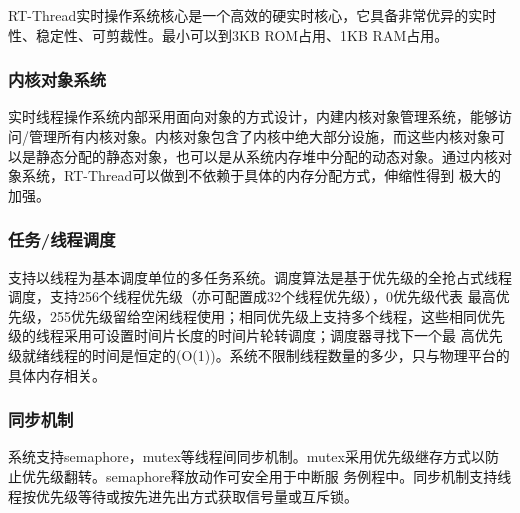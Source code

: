 RT-Thread实{\cf}时操{\cf}作系{\cf}统核{\cf}心是{\cf}一个{\cf}高效{\cf}的硬{\cf}实时{\cf}核心{\cf}，它{\cf}具备{\cf}非常{\cf}优异{\cf}的实{\cf}时性{\cf}、稳{\cf}定性{\cf}、可{\cf}剪裁{\cf}性。{\cf}最小{\cf}可以{\cf}到3{\cf}KB{\cf} R{\cf}OM{\cf}占用{\cf}、1{\cf}KB{\cf} R{\cf}AM{\cf}占用。

\subsubsection{内核对象系统}
实{\cf}时线{\cf}程操{\cf}作系{\cf}统内{\cf}部采{\cf}用面{\cf}向对{\cf}象的{\cf}方式{\cf}设计{\cf}，内{\cf}建内{\cf}核对{\cf}象管{\cf}理系{\cf}统，{\cf}能够{\cf}访问{\cf}/管{\cf}理所{\cf}有内{\cf}核对{\cf}象。{\cf}内核{\cf}对象{\cf}包含{\cf}了内{\cf}核中{\cf}绝大{\cf}部分{\cf}设施{\cf}，而{\cf}这些{\cf}内核{\cf}对象{\cf}可 {\cf}以是{\cf}静态{\cf}分配{\cf}的静{\cf}态对{\cf}象，{\cf}也可{\cf}以是{\cf}从系{\cf}统内{\cf}存堆{\cf}中分{\cf}配的{\cf}动态{\cf}对象{\cf}。通{\cf}过内{\cf}核对{\cf}象系{\cf}统，{\cf}RT{\cf}-T{\cf}hr{\cf}ea{\cf}d可{\cf}以做{\cf}到不{\cf}依赖{\cf}于具{\cf}体的{\cf}内存{\cf}分配{\cf}方式{\cf}，伸{\cf}缩性{\cf}得到{\cf} 极{\cf}大的{\cf}加强。


\subsubsection{任务/线程调度}
支{\cf}持以{\cf}线程{\cf}为基{\cf}本调{\cf}度单{\cf}位的{\cf}多任{\cf}务系{\cf}统。{\cf}调度{\cf}算法{\cf}是基{\cf}于优{\cf}先级{\cf}的全{\cf}抢占{\cf}式线{\cf}程调{\cf}度，{\cf}支持{\cf}25{\cf}6个{\cf}线程{\cf}优先{\cf}级（{\cf}亦可{\cf}配置{\cf}成3{\cf}2个{\cf}线程{\cf}优先{\cf}级）{\cf}，0{\cf}优先{\cf}级代{\cf}表 {\cf}最高{\cf}优先{\cf}级，{\cf}25{\cf}5优{\cf}先级{\cf}留给{\cf}空闲{\cf}线程{\cf}使用{\cf}；相{\cf}同优{\cf}先级{\cf}上支{\cf}持多{\cf}个线{\cf}程，{\cf}这些{\cf}相同{\cf}优先{\cf}级的{\cf}线程{\cf}采用{\cf}可设{\cf}置时{\cf}间片{\cf}长度{\cf}的时{\cf}间片{\cf}轮转{\cf}调度{\cf}；调{\cf}度器{\cf}寻找{\cf}下一{\cf}个最{\cf} 高{\cf}优先{\cf}级就{\cf}绪线{\cf}程的{\cf}时间{\cf}是恒{\cf}定的{\cf}(O{\cf}(1{\cf})){\cf}。系{\cf}统不{\cf}限制{\cf}线程{\cf}数量{\cf}的多{\cf}少，{\cf}只与{\cf}物理{\cf}平台{\cf}的具{\cf}体内{\cf}存相关。

\subsubsection{同步机制}
系{\cf}统支{\cf}持s{\cf}em{\cf}ap{\cf}ho{\cf}re{\cf}，m{\cf}ut{\cf}ex{\cf}等线{\cf}程间{\cf}同步{\cf}机制{\cf}。m{\cf}ut{\cf}ex{\cf}采用{\cf}优先{\cf}级继{\cf}存方{\cf}式以{\cf}防止{\cf}优先{\cf}级翻{\cf}转。{\cf}se{\cf}ma{\cf}ph{\cf}or{\cf}e释{\cf}放动{\cf}作可{\cf}安全{\cf}用于{\cf}中断{\cf}服 {\cf}务例{\cf}程中{\cf}。同{\cf}步机{\cf}制支{\cf}持线{\cf}程按{\cf}优先{\cf}级等{\cf}待或{\cf}按先{\cf}进先{\cf}出方{\cf}式获{\cf}取信{\cf}号量{\cf}或互{\cf}斥锁。

